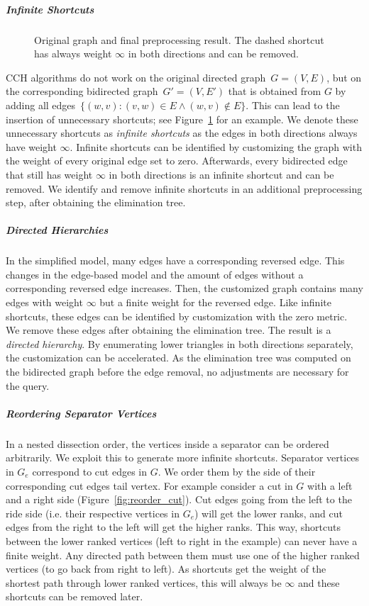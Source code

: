\documentclass[a4paper, english, cleveref]{lipics-v2021}
\begin{document}
\subparagraph*{Infinite Shortcuts}

\begin{figure}[tb]
  \centering
  
  \caption{Original graph and final preprocessing result. The dashed shortcut has always weight $\infty$ in both directions and can be removed.}
  \label{fig:infinite-shortcut}
\end{figure}

CCH algorithms do not work on the original directed graph~$G = (V, E)$, but on the corresponding bidirected graph~$G' = (V, E')$ that is obtained from $G$ by adding all edges~$\{(w, v): (v, w) \in E \land (w, v) \notin E\}$.
This can lead to the insertion of unnecessary shortcuts; see Figure~\ref{fig:infinite-shortcut} for an example.
We denote these unnecessary shortcuts as \emph{infinite shortcuts} as the edges in both directions always have weight $\infty$.
Infinite shortcuts can be identified by customizing the graph with the weight of every original edge set to zero.
Afterwards, every bidirected edge that still has weight $\infty$ in both directions is an infinite shortcut and can be removed.
We identify and remove infinite shortcuts in an additional preprocessing step, after obtaining the elimination tree.

\subparagraph*{Directed Hierarchies}

In the simplified model, many edges have a corresponding reversed edge.
This changes in the edge-based model and the amount of edges without a corresponding reversed edge increases.
Then, the customized graph contains many edges with weight $\infty$ but a finite weight for the reversed edge.
Like infinite shortcuts, these edges can be identified by customization with the zero metric.
We remove these edges after obtaining the elimination tree.
The result is a \emph{directed hierarchy}.
By enumerating lower triangles in both directions separately, the customization can be accelerated.
As the elimination tree was computed on the bidirected graph before the edge removal, no adjustments are necessary for the query.

\subparagraph*{Reordering Separator Vertices}

In a nested dissection order, the vertices inside a separator can be ordered arbitrarily.
We exploit this to generate more infinite shortcuts.
Separator vertices in $G_e$ correspond to cut edges in $G$.
We order them by the side of their corresponding cut edges tail vertex.
For example consider a cut in $G$ with a left and a right side (Figure~\ref{fig:reorder_cut}).
Cut edges going from the left to the ride side (i.e. their respective vertices in $G_e$) will get the lower ranks, and cut edges from the right to the left will get the higher ranks.
This way, shortcuts between the lower ranked vertices (left to right in the example) can never have a finite weight.
Any directed path between them must use one of the higher ranked vertices (to go back from right to left).
As shortcuts get the weight of the shortest path through lower ranked vertices, this will always be $\infty$ and these shortcuts can be removed later.
\end{document}
